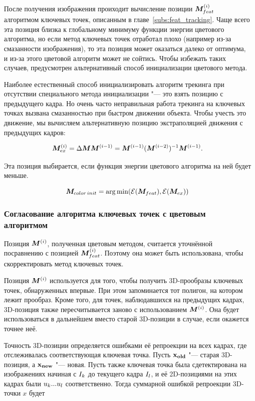 После получения изображения проиходит вычисление позиции $\bm{M}^{\left( i \right)}_{feat}$
алгоритмом
ключевых точек, описанным в главе~\ref{subs:feat_tracking}.
Чаще всего эта позиция близка к глобальному минимуму функции энергии цветового
алгоритма, но если метод ключевых точек отработал плохо (например из-за
смазанности изображения), то эта позиция может оказаться далеко от оптимума, и
из-за этого цветовой алгоритм может не сойтись.
Чтобы избежать таких случаев, предусмотрен альтернативный способ инициализации
цветового метода.

Наиболее естественный способ инициализировать алгоритм трекинга при отсутствии
специального метода инициализации "--- это взять позицию с предыдущего кадра.
Но очень часто неправильная работа трекинга на ключевых точках вызвана
смазанностью при быстром движении объекта.
Чтобы учесть это движение, мы вычисляем альтернативную позицию экстраполяцией
движения с предыдущих кадров:

\begin{equation}
\label{eqn:extrapolation}
\bm{M}^{\left( i \right)}_{ex} = \Delta \bm{M} \bm{M}^{\left( i - 1 \right)} = \bm{M}^{\left( i -
1 \right)}(\bm{M}^{\left( i - 2 \right)})^{-1} \bm{M}^{\left( i - 1 \right)}
\text{.}
\end{equation}

Эта позиция выбирается, если функция энергии цветового алгоритма на ней будет
меньше.

\begin{equation}
\label{eqn:init_selection}
    \bm{M}_{color \, init} = \operatorname*{arg\,min}(\mathcal{E}(\bm{M}_{feat}), \mathcal{E}(\bm{M}_{ex}))
\end{equation}

\subsubsection*{Согласование алгоритма ключевых точек с цветовым алгоритмом}
Позиция $\bm{M}^{\left( i \right)}$, полученная цветовым методом, считается уточнённой
посравнению с позицией $\bm{M}^{\left( i \right)}_{feat}$.
Поэтому она может быть использована, чтобы скорректировать метод ключевых
точек.

Позиция $\bm{M}^{\left( i \right)}$ используется для того, чтобы получить 3D-прообразы
ключевых точек, обнаруженных впервые.
При этом запоминается тот полигон, на котором лежит прообраз.
Кроме того, для точек, наблюдавшихся на предыдущих кадрах, 3D-позиция также
пересчитывается заново с использованием $\bm{M}^{\left( i \right)}$.
Она будет использоваться в дальнейшем вместо старой 3D-позиции в случае, если
окажется точнее неё.

Точность 3D-позиции определяется ошибками её репроекции на всех кадрах, где
отслеживалась соответствующая ключевая точка.
Пусть $\mathbf{x_{old}}$ "--- старая 3D-позиция, а $\mathbf{x_{new}}$ "--- новая. 
Пусть также ключевая точка была сдетектирована на изображениях начиная с
$I_k$
до текущего кадра $I_l$, и её 2D-позициями на этих кадрах были $\mathnormal{u}_k ...
\mathnormal{u}_l$
соответственно.
Тогда суммарной ошибкой репроекции 3D-точки $x$ будет

